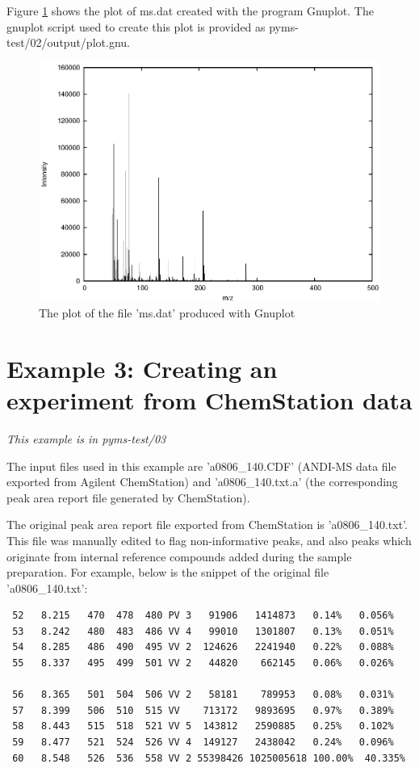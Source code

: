 Figure \ref{fig:mass-spectrum} shows the plot of ms.dat created with the
program Gnuplot. The gnuplot script used to create this plot is
provided as pyms-test/02/output/plot.gnu.

\begin{figure}[htp]
\begin{center}
\includegraphics{graphics/ms.eps}
\caption{The plot of the file 'ms.dat' produced with Gnuplot}
\label{fig:mass-spectrum}
\end{center}
\end{figure}

\section{Example 3: Creating an experiment from ChemStation data}

\noindent
{\em This example is in pyms-test/03}

The input files used in this example are 'a0806\_140.CDF' (ANDI-MS data
file exported from Agilent ChemStation) and 'a0806\_140.txt.a' (the 
corresponding peak area report file generated by ChemStation).

The original peak area report file exported from ChemStation is
'a0806\_140.txt'. This file was manually edited to flag non-informative
peaks, and also peaks which originate from internal reference compounds
added during the sample preparation. For example, below is the snippet
of the original file 'a0806\_140.txt':

\begin{verbatim}
 52   8.215   470  478  480 PV 3   91906   1414873   0.14%   0.056%
 53   8.242   480  483  486 VV 4   99010   1301807   0.13%   0.051%
 54   8.285   486  490  495 VV 2  124626   2241940   0.22%   0.088%
 55   8.337   495  499  501 VV 2   44820    662145   0.06%   0.026%
 
 56   8.365   501  504  506 VV 2   58181    789953   0.08%   0.031%
 57   8.399   506  510  515 VV    713172   9893695   0.97%   0.389%
 58   8.443   515  518  521 VV 5  143812   2590885   0.25%   0.102%
 59   8.477   521  524  526 VV 4  149127   2438042   0.24%   0.096%
 60   8.548   526  536  558 VV 2 55398426 1025005618 100.00%  40.335%
\end{verbatim}

